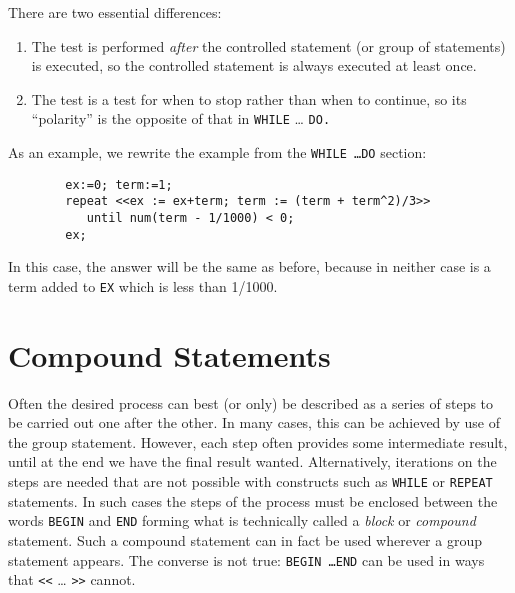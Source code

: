 There are two essential differences:
\begin{enumerate}
\item The test is performed \emph{after} the controlled statement (or group of
statements) is executed, so the controlled statement is always executed at
least once.

\item The test is a test for when to stop rather than when to continue, so its
``polarity'' is the opposite of that in \texttt{WHILE} \ldots{} \texttt{DO.}
\end{enumerate}

As an example, we rewrite the example from the \texttt{WHILE \ldots DO} section:
\begin{samepage}
\begin{verbatim}
        ex:=0; term:=1;
        repeat <<ex := ex+term; term := (term + term^2)/3>>
           until num(term - 1/1000) < 0;
        ex;
\end{verbatim}
\end{samepage}
In this case, the answer will be the same as before, because in neither
case is a term added to \texttt{EX} which is less than 1/1000.

\section{Compound Statements}
\hypertarget{command:BEGIN}{}

Often the desired process can best (or only) be
described as a series of steps to be carried out one after the other.  In
many cases, this can be achieved by use of the group statement.  However, each step often provides some intermediate
result, until at the end we have the final result wanted.  Alternatively,
iterations on the steps are needed that are not possible with constructs
such as \texttt{WHILE} or \texttt{REPEAT}
statements.  In such cases the steps of the process must be
enclosed between the words \texttt{BEGIN} and \texttt{END} forming what is technically called a \emph{block} or
\emph{compound} statement.  Such a compound statement can in fact be used
wherever a group statement appears.  The converse is not true: {\tt BEGIN
\ldots END} can be used in ways that \texttt{<<} \ldots{} \texttt{>>} cannot.

\hypertarget{command:SCALAR}{}
\hypertarget{command:INTEGER}{}
\hypertarget{command:REAL}{}

